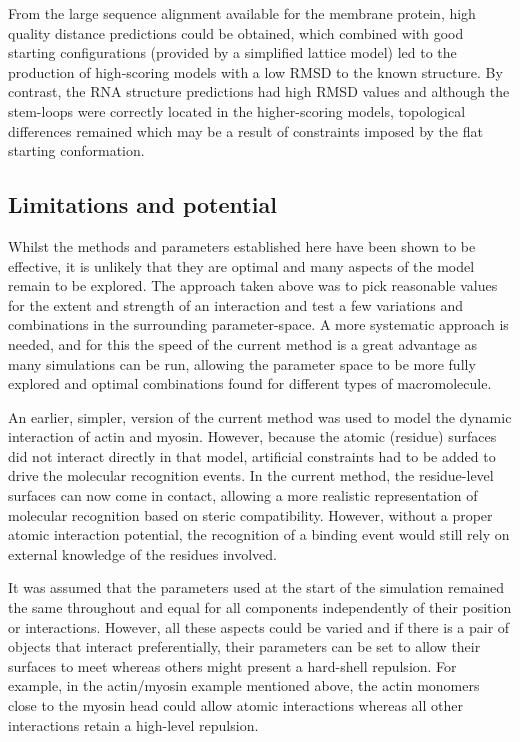 From the large sequence alignment available for the membrane protein, high
quality distance predictions could be obtained, which combined with good
starting configurations (provided by a simplified lattice model) led to 
the production of high-scoring models with a low RMSD to the known structure.
By contrast, the RNA structure predictions had high RMSD values and although
the stem-loops were correctly located in the higher-scoring models, topological
differences remained which may be a result of constraints imposed by the
flat starting conformation.

\subsection{Limitations and potential}

Whilst the methods and parameters established here have been shown to be
effective, it is unlikely that they are optimal and many aspects of the
model remain to be explored.    The approach taken above was to pick
reasonable values for the extent and strength of an interaction and test
a few variations and combinations in the surrounding parameter-space.
A more systematic approach is needed, and for this the speed of the current
method is a great advantage as many simulations can be run, allowing the
parameter space to be more fully explored and optimal combinations found
for different types of macromolecule.

An earlier, simpler, version of the current method was used to model the
dynamic interaction of actin and myosin.   However, because the atomic (residue)
surfaces did not interact directly in that model, artificial constraints had
to be added to drive the molecular recognition events.  In the current
method, the residue-level surfaces can now come in contact, allowing a more
realistic representation of molecular recognition based on steric compatibility.
However, without a proper atomic interaction potential, the recognition of 
a binding event would still rely on external knowledge of the residues involved.

It was assumed that the parameters used at the start of the simulation remained
the same throughout and equal for all components independently of their
position or interactions.   However, all these aspects could be varied and
if there is a pair of objects that interact preferentially, their parameters
can be set to allow their surfaces to meet whereas others might present a
hard-shell repulsion.  For example, in the actin/myosin example mentioned
above, the actin monomers close to the myosin head could allow atomic
interactions whereas all other interactions retain a high-level repulsion.

